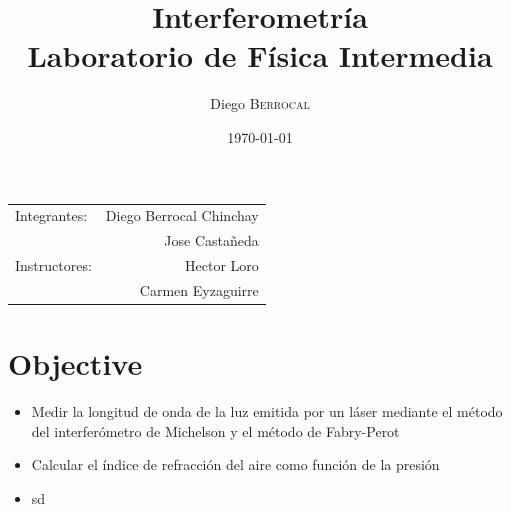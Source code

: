 \documentclass{article}
\title{Interferometría\\ Laboratorio de Física Intermedia} %
\author{Diego \textsc{Berrocal}} %
\date{\today} %
\begin{document}
\maketitle %

\begin{center}
  \begin{tabular}{l r}
    Integrantes: & Diego Berrocal Chinchay\\ %
    & Jose Castañeda\\
    Instructores: & Hector Loro \\ & Carmen Eyzaguirre
  \end{tabular}
\end{center}



\section{Objective}

\begin{itemize}
\item Medir la longitud de onda de la luz emitida por un láser
  mediante el método del interferómetro de Michelson y el método de
  Fabry-Perot
\item Calcular el índice de refracción del aire como función de la
  presión
\item sd 



\end{itemize}

\begin{center}\end{center}

\end{document}

